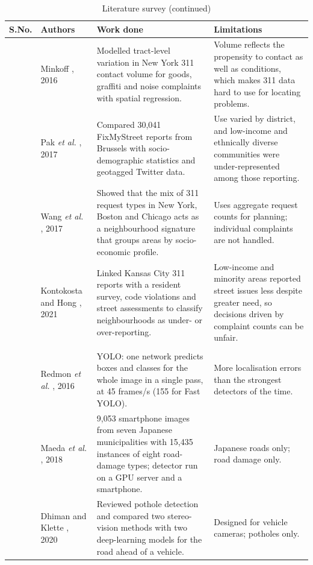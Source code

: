 \documentclass{ieeeaccess}
\begin{document}
\begin{table}[!t]
\addtocounter{table}{-1}
\caption{Literature survey (continued)}
\centering
\footnotesize
\setlength{\tabcolsep}{3pt}
\renewcommand{\arraystretch}{1.1}
\begin{tabular}{@{}>{\centering\arraybackslash}p{}p{}p{}p{}@{}}
\toprule
S.No. & Authors & Work done & Limitations\\
\midrule
12 & Minkoff \cite{b25}, 2016 & Modelled tract-level variation in New York 311 contact volume for goods, graffiti and noise complaints with spatial regression. & Volume reflects the propensity to contact as well as conditions, which makes 311 data hard to use for locating problems.\\
13 & Pak \textit{et al.} \cite{b13}, 2017 & Compared 30,041 FixMyStreet reports from Brussels with socio-demographic statistics and geotagged Twitter data. & Use varied by district, and low-income and ethnically diverse communities were under-represented among those reporting.\\
14 & Wang \textit{et al.} \cite{b26}, 2017 & Showed that the mix of 311 request types in New York, Boston and Chicago acts as a neighbourhood signature that groups areas by socio-economic profile. & Uses aggregate request counts for planning; individual complaints are not handled.\\
15 & Kontokosta and Hong \cite{b14}, 2021 & Linked Kansas City 311 reports with a resident survey, code violations and street assessments to classify neighbourhoods as under- or over-reporting. & Low-income and minority areas reported street issues less despite greater need, so decisions driven by complaint counts can be unfair.\\
\multicolumn{4}{@{}l}{\textit{C. Vision models for civic defects}}\\
16 & Redmon \textit{et al.} \cite{b27}, 2016 & YOLO: one network predicts boxes and classes for the whole image in a single pass, at 45 frames/s (155 for Fast YOLO). & More localisation errors than the strongest detectors of the time.\\
17 & Maeda \textit{et al.} \cite{b28}, 2018 & 9,053 smartphone images from seven Japanese municipalities with 15,435 instances of eight road-damage types; detector run on a GPU server and a smartphone. & Japanese roads only; road damage only.\\
18 & Dhiman and Klette \cite{b29}, 2020 & Reviewed pothole detection and compared two stereo-vision methods with two deep-learning models for the road ahead of a vehicle. & Designed for vehicle cameras; potholes only.\\

\end{tabular}
\end{table}
\end{document}
